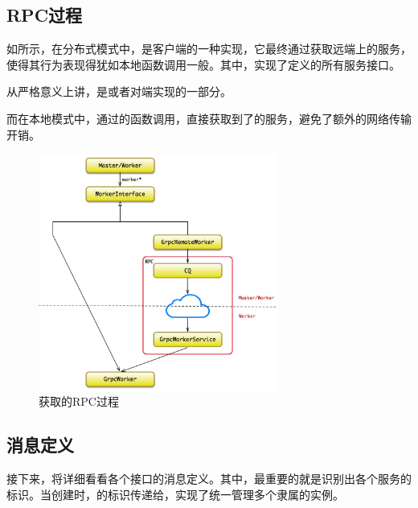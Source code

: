 \begin{content}
\subsection{RPC过程}

如所示，在分布式模式中，是客户端的一种实现，它最终通过获取远端上的服务，使得其行为表现得犹如本地函数调用一般。其中，实现了定义的所有服务接口。

\begin{remark}
从严格意义上讲，是或者对端实现的一部分。
\end{remark}

而在本地模式中，通过的函数调用，直接获取到了的服务，避免了额外的网络传输开销。

\begin{figure}[H]
\centering
\includegraphics[width=0.7\textwidth]{figures/dist-worker-interaction.png}
\caption{获取的RPC过程}
 \label{fig:dist-worker-interaction}
\end{figure}

\subsection{消息定义}

接下来，将详细看看各个接口的消息定义。其中，最重要的就是识别出各个服务的标识。当创建时，的标识传递给，实现了统一管理多个隶属的实例。


\end{content}
